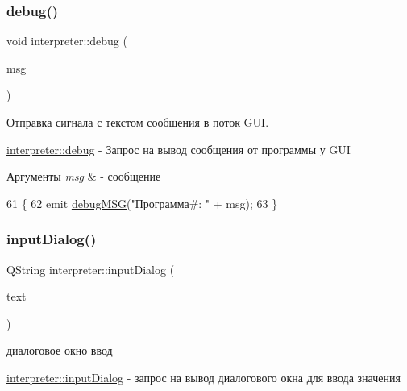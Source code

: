 \subsubsection{\texorpdfstring{debug()}{debug()}}
{\footnotesize\ttfamily void interpreter\+::debug (\begin{DoxyParamCaption}\item[{Q\+String}]{msg }\end{DoxyParamCaption})\hspace{0.3cm}{\ttfamily [private]}}



Отправка сигнала с текстом сообщения в поток G\+UI. 

\hyperlink{classinterpreter_a5153712027e3e4344f72336f8b5cfa6d}{interpreter\+::debug} -\/ Запрос на вывод сообщения от программы у G\+UI


\begin{DoxyParams}{Аргументы}
{\em msg} & -\/ сообщение \\
\hline
\end{DoxyParams}

\begin{DoxyCode}
61 \{
62     emit \hyperlink{classinterpreter_a60e0781065c7ae88bdcaaa22729dc458}{debugMSG}(\textcolor{stringliteral}{"Программа#: "} + msg);
63 \}
\end{DoxyCode}
\hypertarget{classinterpreter_a30d9b904383c7b73adceeca002461431}{}\label{classinterpreter_a30d9b904383c7b73adceeca002461431} 
\subsubsection{\texorpdfstring{input\+Dialog()}{inputDialog()}}
{\footnotesize\ttfamily Q\+String interpreter\+::input\+Dialog (\begin{DoxyParamCaption}\item[{Q\+String}]{text }\end{DoxyParamCaption})\hspace{0.3cm}{\ttfamily [private]}}



диалоговое окно ввод 

\hyperlink{classinterpreter_a30d9b904383c7b73adceeca002461431}{interpreter\+::input\+Dialog} -\/ запрос на вывод диалогового окна для ввода значения


